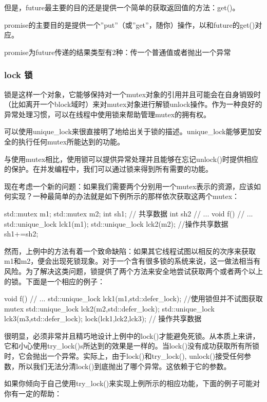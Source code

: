 但是，future最主要的目的还是提供一个简单的获取返回值的方法：get()。

promise的主要目的是提供一个”put”（或”get”，随你）操作，以和future的get()对应。

promise为future传递的结果类型有2种：传一个普通值或者抛出一个异常

\subsubsection{lock 锁}
锁是这样一个对象，它能够保持对一个mutex对象的引用并且可能会在自身销毁时（比如离开一个block域时）来对mutex对象进行解锁unlock操作。作为一种良好的异常处理习惯，可以在线程中使用锁来帮助管理mutex的拥有权。

可以使用unique_lock来很直接明了地给出关于锁的描述。unique_lock能够更加安全的执行任何mutex所能达到的功能。

与使用mutex相比，使用锁可以提供异常处理并且能够在忘记unlock()时提供相应的保护。在并发编程中，我们可以通过锁来得到所有需要的功能。

现在考虑一个新的问题：如果我们需要两个分别用一个mutex表示的资源，应该如何实现？一种最简单的办法就是如下例所示的那样依次获取这两个mutex：

\begin{Code}
	std::mutex m1;
	std::mutex m2;
	int sh1; // 共享数据
	int sh2
	// ...
	void f(){
		// ...
		std::unique_lock lck1(m1);
		std::unique_lock lck2(m2);
		//操作共享数据
		sh1+=sh2;
	}
\end{Code}

然而，上例中的方法有着一个致命缺陷：如果其它线程试图以相反的次序来获取m1和m2，便会出现死锁现象。对于一个含有很多锁的系统来说，这一做法相当有风险。为了解决这类问题，锁提供了两个方法来安全地尝试获取两个或者两个以上的锁。下面是一个相应的例子：

\begin{Code}
	void f(){
		// ...
		std::unique_lock lck1(m1,std::defer_lock); //使用锁但并不试图获取mutex
		std::unique_lock lck2(m2,std::defer_lock);
		std::unique_lock lck3(m3,std::defer_lock);
		lock(lck1,lck2,lck3);
		// 操作共享数据
	}
\end{Code}

很明显，必须非常并且精巧地设计上例中的lock()才能避免死锁。从本质上来讲，它和小心使用try_lock()s所达到的效果是一样的。当lock()没有成功获取所有所锁时，它会抛出一个异常。实际上，由于lock()和try_lock(), unlock()接受任何参数，所以我们无法分清lock()到底抛出了哪个异常。这依赖于它的参数。

如果你倾向于自己使用try_lock()来实现上例所示的相应功能，下面的例子可能对你有一定的帮助：

